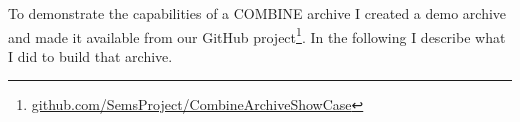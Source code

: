 To demonstrate the capabilities of a COMBINE archive I created a demo archive and made it available from our GitHub project\footnote{\href{https://github.com/SemsProject/CombineArchiveShowCase}{github.com/SemsProject/CombineArchiveShowCase}}. 
In the following I describe what I did to build that archive.
